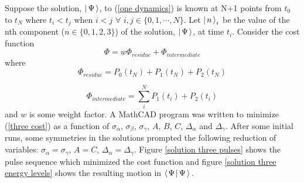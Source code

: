 
Suppose the solution, $\left| \hspace{0.15em} \Psi \hspace{0.15em}\right\rangle$, to (\ref{one dynamics}) is known at N+1 points from $t_0$ to $t_N$ where $t_i<t_j$ when $i<j$ $\forall$  $i,j \in \{0,1,\cdots,N\}$. Let $\left| \hspace{0.15em} n \hspace{0.15em}\right\rangle_i$ be the value of the nth component ($n \in \{ 0,1,2,3 \}$) of the solution, $\left| \hspace{0.15em} \Psi \hspace{0.15em}\right\rangle$, at time $t_i$. Consider the cost function
\begin{equation}
\Phi
=
w\Phi_{residue}
+
\Phi_{intermediate}
\label{three cost}
\end{equation}
where
\begin{equation}
\Phi_{residue}
=
P_0(t_N)
+
P_1(t_N)
+
P_2(t_N)
\label{three residue cost}
\end{equation}

\begin{equation}
\Phi_{intermediate}
=
\sum_i^N
P_1(t_i)
+
P_2(t_i)
\label{three int cost}
\end{equation}
and $w$ is some weight factor.
A MathCAD program was written to minimize (\ref{three cost}) as a function of $\sigma_\alpha$, $\sigma_\beta$, $\sigma_\gamma$, $A$, $B$, $C$, $\Delta_\alpha$ and $\Delta_\gamma$. After some initial runs, some symmetries in the solutions prompted the following reduction of variables: $\sigma_\alpha=\sigma_\gamma$, $A=C$, $\Delta_\alpha=\Delta_\gamma$. Figure \ref{solution three pulses} shows the pulse sequence which minimized the cost function and figure \ref{solution three energy levels} shows the resulting motion in $\left\langle \hspace{0.10em} \Psi \hspace{0.10em} \right| \Psi \left\rangle \right.$.

